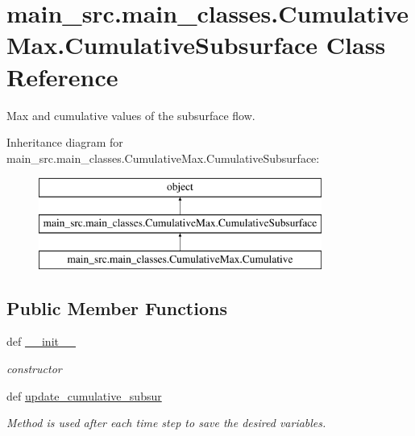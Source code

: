 \hypertarget{classmain__src_1_1main__classes_1_1CumulativeMax_1_1CumulativeSubsurface}{\section{main\-\_\-src.\-main\-\_\-classes.\-Cumulative\-Max.\-Cumulative\-Subsurface Class Reference}
\label{classmain__src_1_1main__classes_1_1CumulativeMax_1_1CumulativeSubsurface}
}


Max and cumulative values of the subsurface flow.  


Inheritance diagram for main\-\_\-src.\-main\-\_\-classes.\-Cumulative\-Max.\-Cumulative\-Subsurface\-:\begin{figure}[H]
\begin{center}
\leavevmode
\includegraphics[height=3.000000cm]{classmain__src_1_1main__classes_1_1CumulativeMax_1_1CumulativeSubsurface}
\end{center}
\end{figure}
\subsection*{Public Member Functions}
\begin{DoxyCompactItemize}
\item 
\hypertarget{classmain__src_1_1main__classes_1_1CumulativeMax_1_1CumulativeSubsurface_a0cada8a65e5aaad5510df6ee80d88c5b}{def \hyperlink{classmain__src_1_1main__classes_1_1CumulativeMax_1_1CumulativeSubsurface_a0cada8a65e5aaad5510df6ee80d88c5b}{\-\_\-\-\_\-init\-\_\-\-\_\-}}\label{classmain__src_1_1main__classes_1_1CumulativeMax_1_1CumulativeSubsurface_a0cada8a65e5aaad5510df6ee80d88c5b}

\begin{DoxyCompactList}\small\item\em constructor \end{DoxyCompactList}\item 
def \hyperlink{classmain__src_1_1main__classes_1_1CumulativeMax_1_1CumulativeSubsurface_a8783245f1420b563ccfe8a02ba18ede4}{update\-\_\-cumulative\-\_\-subsur}
\begin{DoxyCompactList}\small\item\em Method is used after each time step to save the desired variables. \end{DoxyCompactList}\end{DoxyCompactItemize}
